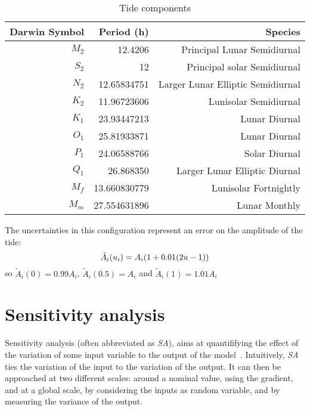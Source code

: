 \documentclass[../../Main_ManuscritThese.tex]{subfiles}
\begin{document}
\label{sec:tidal_modelling}
\begin{table}[!h]
  \centering %
  \begin{tabular}{rrr}\toprule
    Darwin Symbol & Period (h)   & Species                           \\ \midrule
    $M_2$         & 12.4206      & Principal Lunar Semidiurnal       \\
    $S_2$         & 12           & Principal solar Semidiurnal       \\
    $N_2$         & 12.65834751  & Larger Lunar Elliptic Semidiurnal \\
    $K_2$         & 11.96723606  & Lunisolar Semidiurnal             \\
    $K_1$         & 23.93447213  & Lunar Diurnal                     \\\midrule
    $O_1$         & 25.81933871  & Lunar Diurnal                     \\ 
    $P_1$         & 24.06588766  & Solar Diurnal                     \\
    $Q_1$         & 26.868350    & Larger Lunar Elliptic Diurnal     \\
    $M_f$         & 13.660830779 & Lunisolar Fortnightly             \\
    $M_m$         & 27.554631896 & Lunar Monthly                     \\
    \bottomrule
  \end{tabular}
  \caption{Tide components}
  \label{tab:tides_components}
\end{table}
The uncertainties in this configuration represent an error on the amplitude of the tide:
\begin{equation}
  \tilde{A}_i(u_i) = A_i (1 + 0.01(2u - 1))
\end{equation}
so $\tilde{A}_i(0) = 0.99A_i$, $\tilde{A}_i(0.5) = A_i$ and $\tilde{A}_i(1) = 1.01A_i$

\section{Sensitivity analysis}
\label{sec:sensitivity-analysis}
Sensitivity analysis (often abbreviated as \emph{SA}), aims at
quantififying the effect of the variation of some input variable to
the output of the model~\cite{iooss_revue_2011,janon_analyse_2012}.
Intuitively, \emph{SA} ties the variation of the input to the
variation of the output. It can then be approached at two different
scales: around a nominal value, using the gradient, and at a global
scale, by considering the inputs as random variable, and by measuring
the variance of the output.
\end{document}

